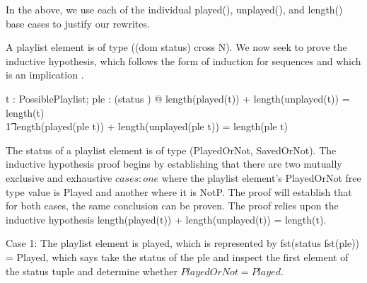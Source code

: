 \documentclass[a4paper,10pt,fleqn]{article}
\begin{document}
\bigskip

\begin{center}
\end{center}
\bigskip

\noindent In the above, we use each of the individual played(), unplayed(), and length() base cases to justify our rewrites.

\bigskip

\noindent A playlist element is of type ((dom status) cross N).  We now seek to prove the inductive hypothesis, which follows the form of induction for sequences and which is an implication \citep[page 157]{simpson-notes}.

\bigskip

\begin{zed}
\forall t : PossiblePlaylist; ple : (\dom status \cross \nat) @ length(played(t)) + length(unplayed(t)) = length(t) \implies \\
\t1 length(played(\langle ple \rangle \cat t)) + length(unplayed(\langle ple \rangle \cat t)) = length(\langle ple \rangle \cat t)
\end{zed}

\noindent The status of a playlist element is of type (PlayedOrNot, SavedOrNot). The inductive hypothesis proof begins by establishing that there are two mutually exclusive and exhaustive $cases : one$ where the playlist element's PlayedOrNot free type value is Played and another where it is NotP.  The proof will establish that for both cases, the same conclusion can be proven. The proof relies upon the inductive hypothesis length(played(t)) + length(unplayed(t)) = length(t). 

\bigskip

\noindent Case 1: The playlist element is played, which is represented by fst(status fst(ple)) = Played, which says take the status of the ple and inspect the first element of the status tuple and determine whether $PlayedOrNot = Played$.
\end{document}
